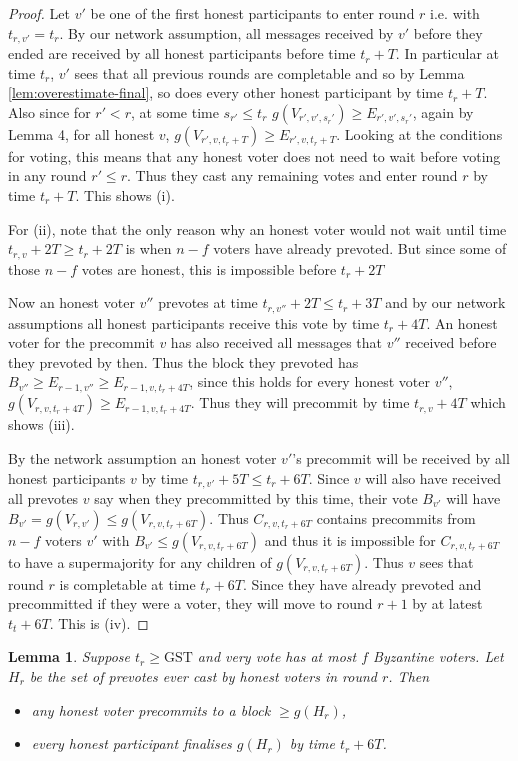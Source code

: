 \documentclass{article}
\newtheorem{lemma}[theorem]{Lemma}
\def\GST{\mathrm{GST}}
\begin{document}
\begin{proof} Let $v'$ be one of the first honest participants to enter round $r$ i.e. with $t_{r,v'}=t_r$. 
By our network assumption, all messages received by $v'$ before they ended are received by all honest participants before time $t_r+T$.
In particular at time $t_r$, $v'$ sees that all previous rounds are completable and so by Lemma \ref{lem:overestimate-final}, so does every other honest participant by time $t_r+T$.
Also since for $r' < r$, at some time $s_{r'} \leq t_r$ $g(V_{r',v',s_r'}) \geq E_{r',v',s_r'}$, again by Lemma 4, for all honest $v$, $g(V_{r',v,t_r+T}) \geq E_{r',v,t_r+T}$. Looking at the conditions for voting, this means that any honest voter does not need to wait before voting in any round $r' \leq r$. 
Thus they cast any remaining votes and enter round $r$ by time $t_r + T$. This shows (i).

For (ii), note that the only reason why an honest voter would not wait until time $t_{r,v}+2T \geq t_r+ 2T$ is when $n-f$ voters have already prevoted. But since some of those $n-f$ votes are honest, this is impossible before $t_r+2T$

Now an honest voter $v''$ prevotes at time $t_{r,v''}+2T \leq t_r +3T$ and by our network assumptions all honest participants receive this vote by time $t_r+4T$. An honest voter for the precommit $v$ has also received all messages that $v''$ received before they prevoted by then.
Thus the block they prevoted has $B_{v''} \geq E_{r-1,v''} \geq E_{r-1,v,t_r+4T}$, since this holds for every honest voter $v''$, $g(V_{r,v,t_r+4T}) \geq E_{r-1,v,t_r+4T}$. Thus they will precommit by time $t_{r,v}+4T$ which shows (iii).

By the network assumption an honest voter $v'$'s precommit will be received by all honest participants $v$ by time $t_{r,v'}+ 5T \leq t_r+6T$.
Since $v$ will also have received all prevotes $v$ say when they precommitted by this time, their vote $B_{v'}$ will have $B_{v'}=g(V_{r,v'}) \leq g(V_{r,v,t_r+6T})$.
Thus $C_{r, v, t_r+6T}$ contains precommits from $n-f$ voters $v'$ with $B_{v'} \leq g(V_{r,v,t_r+6T})$ and thus it is impossible for $C_{r,v,t_r+6T}$ to have a supermajority for any children of $g(V_{r,v, t_r+6T})$.
Thus $v$ sees that round $r$ is completable at time $t_r+6T$. Since they have already prevoted and precommitted if they were a voter, they will move to round $r+1$ by at latest $t_t+6T$. This is (iv).
\end{proof}

\begin{lemma} \label{lem:honest-prevote-timings}
Suppose $t_r \geq \GST$ and very vote has at most $f$ Byzantine voters. Let $H_r$ be the set of prevotes ever cast by honest voters in round $r$. Then
\begin{itemize}
\item[(a)] any honest voter precommits to a block $\geq  g(H_r)$,

\item[(b)] every honest participant finalises $g(H_r)$ by time $t_r+6T$.
\end{itemize}
\end{lemma}
\end{document}
